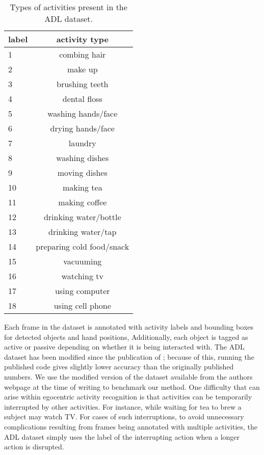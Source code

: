 \documentclass{bmvc2k}
\begin{document}
	\begin{table}
		\begin{center}
			\begin{tabular}{|l|c|}
				\hline \hline
        label & activity type \\
        \hline
        1 & combing hair \\
        \hline
        2 & make up \\
        \hline
        3 & brushing teeth \\
        \hline
        4 & dental floss \\
        \hline
        5 & washing hands/face \\
        \hline
        6 & drying hands/face \\
        \hline
        7 & laundry \\
        \hline
        8 & washing dishes \\
        \hline
        9 & moving dishes \\
        \hline
       10 & making tea \\
        \hline
       11 & making coffee \\
        \hline
       12 & drinking water/bottle \\
        \hline
       13 & drinking water/tap \\
        \hline
       14 & preparing cold food/snack \\
        \hline
       15 & vacuuming \\
        \hline
       16 & watching tv \\
        \hline
       17 & using computer \\
        \hline
       18 & using cell phone \\
				\hline
			\end{tabular}
		\end{center}
		\caption{Types of activities present in the ADL dataset.}
	\end{table}
  
	Each frame in the dataset
	is annotated with activity labels and bounding boxes for detected objects and hand positions, 
	Additionally, each object is tagged as active or passive depending
	on whether it is being interacted with.
	The ADL dataset has been modified since the publication of
	\cite{Ramanan12}; because of this, running the published code gives
	slightly lower accuracy than the originally published numbers. We use the
  modified version of the dataset available from the authors webpage at the time of writing to
  benchmark our method. One difficulty that can arise within egocentric
  activity recognition is that activities can be temporarily interrupted by
  other activities. For instance, while waiting for tea to brew a subject
  may watch TV. For cases of such interruptions, to avoid unnecessary
  complications resulting from frames being annotated with multiple
  activities, the ADL dataset simply uses the label of the interrupting
  action when a longer action is disrupted.
	
\end{document}
